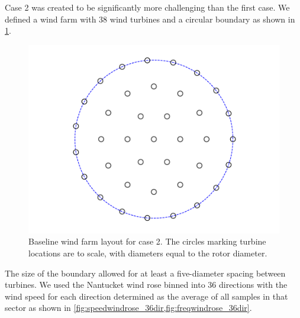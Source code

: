 \documentclass[a4paper]{jpconf}
\begin{document}
  Case 2 was created to be significantly more challenging than the first case. We defined a wind farm with 38 wind turbines and a circular boundary as shown in \cref{fig:round_case}. 
%
\begin{figure}[h!]
	\centering
	\begin{minipage}[t]{18pc}
		\centering
		\includegraphics[width=\textwidth, trim={1.5cm, 0cm, 1.5cm, 0cm}, clip]{final_images/layouts/38_turb_start.pdf}
		\caption{Baseline wind farm layout for case 2. The circles marking turbine locations are to scale, with diameters equal to the rotor diameter.}
		\label{fig:round_case}
	\end{minipage}\hspace{1pc}%
\end{figure}
%
The size of the boundary allowed for at least a five-diameter spacing between turbines. We used the Nantucket wind rose binned into 36 directions with the wind speed for each direction determined as the average of all samples in that sector as shown in \cref{fig:speedwindrose_36dir,fig:freqwindrose_36dir}.
%
\end{document}
